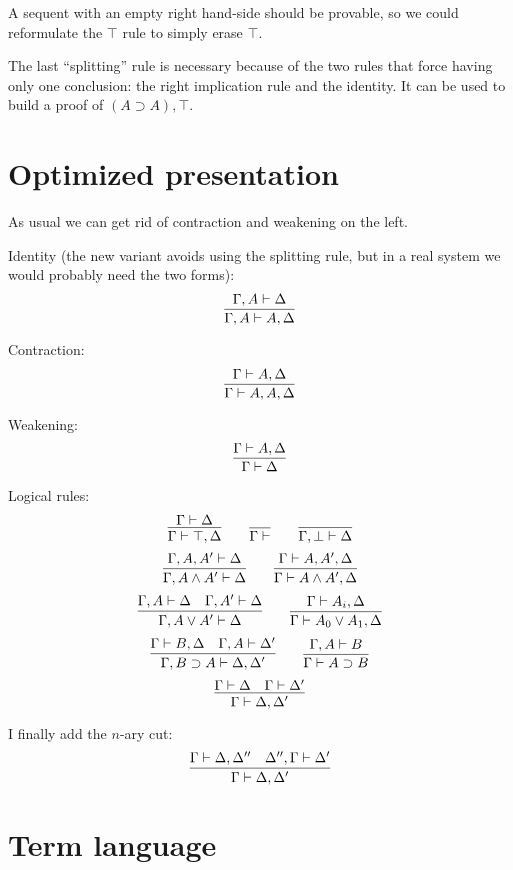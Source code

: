 \documentclass{article}
\renewcommand{\|}{\; | \;}
\begin{document}
A sequent with an empty right hand-side should be provable,
so we could reformulate the $\top$ rule to simply erase $\top$.

The last ``splitting'' rule is necessary because of the two
rules that force having only one conclusion: the
right implication rule and the identity.
It can be used to build a proof of $(A \supset A),\top$.

\section{Optimized presentation}

As usual we can get rid of contraction and weakening on the left.

Identity (the new variant avoids using the splitting rule,
but in a real system we would probably need the two forms):
\[ \infer{\Gamma,A\vdash A,\Delta}{\Gamma,A\vdash \Delta} \]

Contraction:
\[ \infer{\Gamma\vdash A,A,\Delta}{\Gamma\vdash A,\Delta} \]

Weakening:
\[ \infer{\Gamma\vdash \Delta}{\Gamma\vdash A,\Delta} \]

Logical rules:
\[ \infer{\Gamma\vdash\top,\Delta}{\Gamma\vdash\Delta}
    \quad\quad \infer{\Gamma\vdash}{}   
    \quad\quad \infer{\Gamma,\bot\vdash\Delta}{} \]
\[ \infer{\Gamma,A\wedge A'\vdash \Delta}{\Gamma,A,A'\vdash \Delta}
\quad\quad
   \infer{\Gamma\vdash A\wedge A',\Delta}{\Gamma\vdash A,A',\Delta} \]
\[ \infer{\Gamma,A\vee A' \vdash \Delta}{\Gamma,A\vdash \Delta &
                                         \Gamma,A'\vdash \Delta}
\quad\quad
   \infer{\Gamma \vdash A_0\vee A_1,\Delta}{\Gamma\vdash A_i,\Delta} \]
\[ \infer{\Gamma,B\supset A\vdash \Delta,\Delta'}{
      \Gamma\vdash B,\Delta & \Gamma,A\vdash \Delta'}
\quad\quad
   \infer{\Gamma\vdash A\supset B}{\Gamma,A\vdash B} \]
\[ \infer{\Gamma\vdash \Delta,\Delta'}{
      \Gamma\vdash\Delta & \Gamma\vdash\Delta'} \]

I finally add the $n$-ary cut:
\[ \infer{\Gamma\vdash \Delta,\Delta'}{
       \Gamma\vdash \Delta,\Delta'' & \Delta'',\Gamma\vdash\Delta'} \]

\section{Term language}
\end{document}
